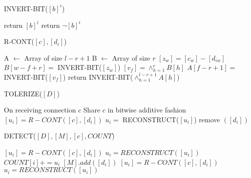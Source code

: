 \documentclass[12pt]{article}
\begin{document}
\begin{algorithm}[H]
\caption{INVERT-BIT($[b]^i$)}
\begin{algorithmic}[1]
\State return $[b]^i$
\Else
\State return $\neg [b]^i$
\EndIf
\end{algorithmic}
\end{algorithm}

\begin{algorithm}[H]
\caption{R-CONT($[c], [d_i]$)}
\begin{algorithmic}[1]
\State A $\gets$ Array of size $l-r+1$
\State B $\gets$ Array of size $r$
\State $[z_w] = [c_w]-[d_{iw}]$
\State $B[w-f+r] = $ INVERT-BIT($[z_w]$)
\EndFor
\State $[v_f] = \wedge_{h=1}^r B[h]$
\State $A[f-r+1] = $ INVERT-BIT($[v_f]$)
\EndFor
\State return  INVERT-BIT($\wedge_{h=1}^{l-r+1} A[h]$)
\end{algorithmic}
\end{algorithm}

\begin{algorithm}[H]
\caption{TOLERIZE($[D]$)}
\begin{algorithmic}[1]
\State On receiving connection $c$
\State \hspace{\algorithmicindent} Share $c$ in bitwise additive fashion 
\State $[u_i] = R-CONT([c],[d_i])$
\State $u_i = $ RECONSTRUCT($[u_i]$)
\State remove $([d_i])$
\EndIf
\EndFor
\end{algorithmic}
\end{algorithm}

\begin{algorithm}[H]
\caption{DETECT($[D], [M], [c], COUNT$)}
\begin{algorithmic}[1]
\State $[u_i] = R-CONT([c],[d_i])$
\State $u_i = RECONSTRUCT([u_i])$
\State $COUNT[i] += u_i$
\State $[M].add([d_i])$
\State {}
\EndIf
\EndFor
{}
\State $[u_i] = R-CONT([c],[d_i])$
\State $u_i = RECONSTRUCT([u_i])$
\State {}
\EndIf
\EndFor
\State {}

\end{algorithmic}
\end{algorithm}

\end{document}
